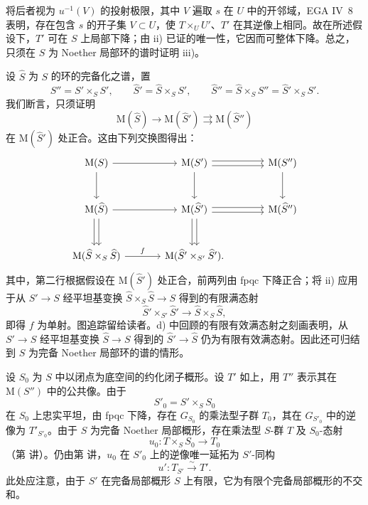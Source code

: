 将后者视为 \(u^{-1}(V)\) 的投射极限，其中 \(V\) 遍取 \(s\) 在 \(U\) 中的开邻域，EGA IV~8 表明，存在包含 \(s\) 的开子集 \(V\subset U\)，使 \(T\times_U U'\)、\(T'\) 在其逆像上相同。故在所述假设下，\(T'\) 可在 \(S\) 上局部下降；由 ii) 已证的唯一性，它因而可整体下降。总之，只须在 \(S\) 为 Noether 局部环的谱时证明 iii)。

设 \(\widehat S\) 为 \(S\) 的环的完备化之谱，置
\[
  S''=S'\times_S S',
  \qquad
  \widehat S'=\widehat S\times_S S',
  \qquad
  \widehat S''=\widehat S\times_S S''
      =\widehat S'\times_S S'.
\]
我们断言，只须证明
\[
  \tag{\(\widehat *\)}\label{sga3:xv:lemma:3-9:equation:widehat-star}
  \mathrm M(\widehat S)\longrightarrow
  \mathrm M(\widehat S')
  \rightrightarrows
  \mathrm M(\widehat S'')
\]
在 \(\mathrm M(\widehat S')\) 处正合。这由下列交换图得出：
\[
\begin{tikzcd}[column sep=large,row sep=large]
\mathrm M(S) \arrow[r] \arrow[d]
  & \mathrm M(S') \arrow[r,shift left=.55ex]
      \arrow[r,shift right=.55ex] \arrow[d]
  & \mathrm M(S'') \arrow[d]\\
\mathrm M(\widehat S) \arrow[r]
      \arrow[d,shift left=.55ex] \arrow[d,shift right=.55ex]
  & \mathrm M(\widehat S') \arrow[r,shift left=.55ex]
      \arrow[r,shift right=.55ex]
      \arrow[d,shift left=.55ex] \arrow[d,shift right=.55ex]
  & \mathrm M(\widehat S'')\\
\mathrm M(\widehat S\times_S\widehat S)
  \arrow[r,"f"]
  & \mathrm M(\widehat S'\times_{S'}\widehat S').
\end{tikzcd}
\]
其中，第二行根据假设在 \(\mathrm M(\widehat S')\) 处正合，前两列由 fpqc 下降正合；将 ii) 应用于从 \(S'\to S\) 经平坦基变换 \(\widehat S\times_S\widehat S\to S\) 得到的有限满态射
\[
  \widehat S'\times_{S'}\widehat S'
  \longrightarrow
  \widehat S\times_S\widehat S,
\]
即得 \(f\) 为单射。图追踪留给读者。d) 中回顾的有限有效满态射之刻画表明，从 \(S'\to S\) 经平坦基变换 \(\widehat S\to S\) 得到的 \(\widehat S'\to\widehat S\) 仍为有限有效满态射。因此还可归结到 \(S\) 为完备 Noether 局部环的谱的情形。

设 \(S_0\) 为 \(S\) 中以闭点为底空间的约化闭子概形。设 \(T'\) 如上，用 \(T''\) 表示其在 \(\mathrm M(S'')\) 中的公共像。由于
\[
  S'_0=S'\times_S S_0
\]
在 \(S_0\) 上忠实平坦，由 fpqc 下降，存在 \(G_{S_0}\) 的乘法型子群 \(T_0\)，其在 \(G_{S'_0}\) 中的逆像为 \(T'_{S'_0}\)。由于 \(S\) 为完备 Noether 局部概形，存在乘法型 \(S\)-群 \(T\) 及 \(S_0\)-态射
\[
  u_0:T\times_S S_0\longrightarrow T_0
\]
（第  讲）。仍由第  讲，\(u_0\) 在 \(S'_0\) 上的逆像唯一延拓为 \(S'\)-同构
\[
  u':T_{S'}\xrightarrow{\sim}T'.
\]
此处应注意，由于 \(S'\) 在完备局部概形 \(S\) 上有限，它为有限个完备局部概形的不交和。

